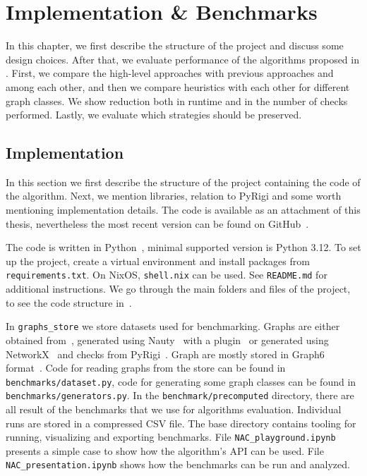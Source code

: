 \chapter{Implementation \& Benchmarks}%
\label{chapter:benchmarks}

\begin{chapterabstract}

	In this chapter, we first describe the structure of the project
	and discuss some design choices.
	After that, we evaluate performance of the algorithms
	proposed in .
	First, we compare the high-level approaches with previous approaches and among each other,
	and then we compare heuristics with each other
	for different  graph classes.
	We show reduction both in runtime and in the number
	of \IsNACColoring{} checks performed.
	Lastly, we evaluate which strategies should be preserved.

\end{chapterabstract}

\section{Implementation}


In this section we first describe the structure of the project containing
the code of the algorithm.
Next, we mention libraries, relation to PyRigi and
some worth mentioning implementation details.
The code is available as an attachment of this thesis,
nevertheless the most recent version can be found on GitHub~\cite{my_code}.

The code is written in Python~\cite{python}, minimal supported version is Python 3.12.
To set up the project, create a virtual environment and install packages
from \texttt{requirements.txt}. On NixOS, \texttt{shell.nix} can be used.
See \texttt{README.md} for additional instructions.
We go through the main folders and files of the project,
to see the code structure in~.

In \texttt{graphs\_store} we store datasets used for benchmarking.
Graphs are either obtained from~\cite{extremal_graphs},
generated using Nauty~\cite{nauty} with a plugin~\cite{nauty_plugin}
or generated using NetworkX~\cite{networkx} and checks from PyRigi~\cite{pyrigi}.
Graph are mostly stored in Graph6 format~\cite{graph6}.
Code for reading graphs from the store can be found in \texttt{benchmarks/dataset.py},
code for generating some graph classes can be found in  \texttt{benchmarks/generators.py}.
In the \texttt{benchmark/precomputed} directory, there are all result of the benchmarks that
we use for algorithms evaluation.
Individual runs are stored in a compressed CSV file.
%
The base directory contains tooling for running, visualizing and exporting benchmarks.
File \texttt{NAC\_playground.ipynb} presents a simple case
to show how the algorithm's API can be used.
File \texttt{NAC\_presentation.ipynb} shows how the benchmarks can be run and analyzed.

